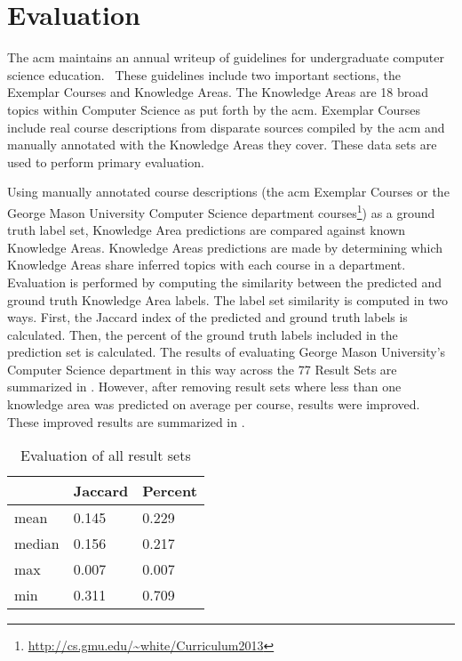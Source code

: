 \section{Evaluation}
\label{sec:evaluation}


The \ac{acm} maintains an annual writeup of guidelines for undergraduate computer science education.~\cite{CS2013}
These guidelines include two important sections, the Exemplar Courses and Knowledge Areas.
The Knowledge Areas are 18 broad topics within Computer Science as put forth by the \ac{acm}.
Exemplar Courses include real course descriptions from disparate sources compiled by the \ac{acm} and manually annotated with the Knowledge Areas they cover.
These data sets are used to perform primary evaluation.


Using manually annotated course descriptions (the \ac{acm} Exemplar Courses or the George Mason University Computer Science department courses\footnote{\url{http://cs.gmu.edu/~white/Curriculum2013}}) as a ground truth label set, Knowledge Area predictions are compared against known Knowledge Areas.
Knowledge Areas predictions are made by determining which Knowledge Areas share inferred topics with each course in a department.
Evaluation is performed by computing the similarity between the predicted and ground truth Knowledge Area labels.
The label set similarity is computed in two ways.
First, the Jaccard index of the predicted and ground truth labels is calculated.
Then, the percent of the ground truth labels included in the prediction set is calculated.
The results of evaluating George Mason University's Computer Science department in this way across the 77 Result Sets are summarized in .
However, after removing result sets where less than one knowledge area was predicted on average per course, results were improved.
These improved results are summarized in .


\begin{table}[ht]
\centering
\begin{tabular}{lll}
\toprule
& Jaccard & Percent \\
\midrule
mean   & 0.145 & 0.229 \\
median & 0.156 & 0.217 \\
\midrule
max    & 0.007 & 0.007 \\
min    & 0.311 & 0.709 \\
\bottomrule
\end{tabular}
\caption{Evaluation of all result sets\label{tbl:evaluation-before}}
\end{table}

